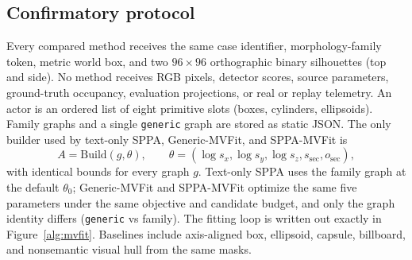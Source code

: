 \documentclass[11pt,a4paper]{article}
\begin{document}
\subsection{Confirmatory protocol}
\label{sec:mvfit}

Every compared method receives the same case identifier, morphology-family
token, metric world box, and two \(96\times 96\) orthographic binary
silhouettes (top and side). No method receives RGB pixels, detector scores,
source parameters, ground-truth occupancy, evaluation projections, or real or
replay telemetry. An actor is an ordered list of eight primitive slots (boxes,
cylinders, ellipsoids). Family graphs and a single \texttt{generic} graph are
stored as static JSON. The only builder used by text-only SPPA, Generic-MVFit,
and SPPA-MVFit is
\begin{equation}
A = \mathrm{Build}(g,\theta),\qquad
\theta=(\log s_x,\log s_y,\log s_z,s_{\mathrm{sec}},o_{\mathrm{sec}}),
\end{equation}
with identical bounds for every graph \(g\). Text-only SPPA uses the family
graph at the default \(\theta_0\); Generic-MVFit and SPPA-MVFit optimize the
same five parameters under the same objective and candidate budget, and only
the graph identity differs (\texttt{generic} vs family). The fitting loop is
written out exactly in Figure~\ref{alg:mvfit}. Baselines include
axis-aligned box, ellipsoid, capsule, billboard, and nonsemantic visual hull
from the same masks.
\end{document}

